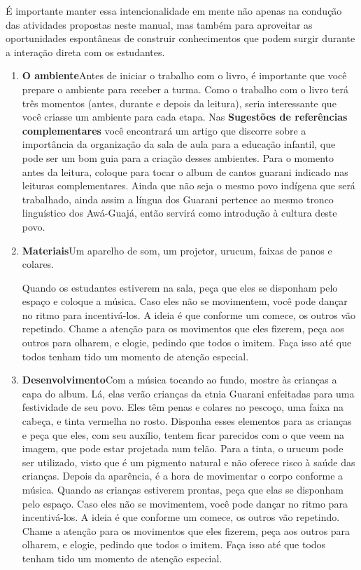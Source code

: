 \documentclass[11pt]{extarticle}
\begin{document}
{{É importante manter essa intencionalidade em mente não apenas na condução 
das atividades propostas neste manual, mas também para aproveitar as 
oportunidades espontâneas de construir conhecimentos que podem surgir durante 
a interação direta com os estudantes.

\begin{enumerate}
\item \textbf{O ambiente}\quad Antes de iniciar o trabalho com o livro, é importante que você 
prepare o ambiente para receber a turma. Como o trabalho com o livro terá 
três momentos (antes, durante e depois da leitura), seria interessante que você 
criasse um ambiente para cada etapa. Nas \textbf{Sugestões de referências complementares} 
você encontrará um artigo que discorre sobre a importância da organização da sala 
de aula para a educação infantil, que pode ser um bom guia para a criação desses 
ambientes. Para o momento antes da leitura, coloque para tocar o album de cantos 
guarani indicado nas leituras complementares. Ainda que não seja o mesmo povo
indígena que será trabalhado, ainda assim a língua dos Guarani pertence ao mesmo tronco
linguístico dos Awá-Guajá, então servirá como introdução à cultura deste povo.


\item \textbf{Materiais}\quad Um aparelho de som, um projetor, urucum, 
faixas de panos e colares. 

Quando os estudantes estiverem na sala,
peça que eles se disponham pelo espaço e coloque a música. Caso eles não 
se movimentem, você pode dançar no ritmo para incentivá-los. A ideia é que
conforme um comece, os outros vão repetindo. Chame a atenção para os movimentos
que eles fizerem, peça aos outros para olharem, e elogie, pedindo que todos
o imitem. Faça isso até que todos tenham tido um momento de atenção especial. 


\item \textbf{Desenvolvimento}\quad Com a música tocando ao fundo, mostre
às crianças a capa do album. Lá, elas verão crianças da etnia Guarani
enfeitadas para uma festividade de seu povo. Eles têm penas e colares no
pescoço, uma faixa na cabeça, e tinta vermelha no rosto. Disponha esses 
elementos para as crianças e peça que eles, com seu auxílio, tentem
ficar parecidos com o que veem na imagem, que pode estar projetada num telão. 
Para a tinta, o urucum pode ser utilizado, visto que é um pigmento natural
e não oferece risco à saúde das crianças.
Depois da aparência, é a hora de movimentar o corpo conforme a música.
Quando as crianças estiverem prontas, peça que elas se disponham pelo espaço. 
Caso eles não se movimentem, você pode dançar no ritmo para incentivá-los. A ideia é que
conforme um comece, os outros vão repetindo. Chame a atenção para os movimentos
que eles fizerem, peça aos outros para olharem, e elogie, pedindo que todos
o imitem. Faça isso até que todos tenham tido um momento de atenção especial. 


\end{enumerate}}}
\end{document}
